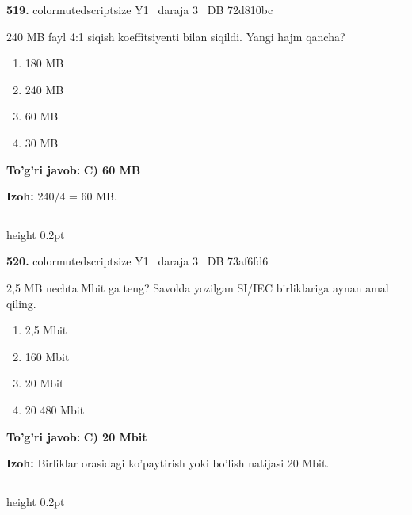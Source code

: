 \documentclass[10pt,a4paper,oneside]{article}
\begin{document}
\noindent\textbf{\color{ink}519.}  {color{muted}scriptsize Y1 \textbullet\ daraja 3 \textbullet\ DB 72d810bc}
\par
240 MB fayl 4:1 siqish koeffitsiyenti bilan siqildi. Yangi hajm qancha?
\begin{enumerate}[label=\Alph*),leftmargin=9mm]
\item 180 MB
\item 240 MB
\item 60 MB
\item 30 MB
\end{enumerate}
\begin{tcolorbox}[enhanced,breakable,colback=teal!4,colframe=teal!50!black,boxrule=0.5pt,arc=1.1mm,left=3mm,right=3mm,top=1.7mm,bottom=1.7mm,before skip=2mm,after skip=2mm]
\textbf{\color{teal}To'g'ri javob:} \textbf{C) 60 MB}
\par\smallskip
\textbf{Izoh:} 240/4 = 60 MB.
\end{tcolorbox}
\vspace{2mm}\hrule height 0.2pt \vspace{3mm}

\noindent\textbf{\color{ink}520.}  {color{muted}scriptsize Y1 \textbullet\ daraja 3 \textbullet\ DB 73af6fd6}
\par
2,5 MB nechta Mbit ga teng? Savolda yozilgan SI/IEC birliklariga aynan amal qiling.
\begin{enumerate}[label=\Alph*),leftmargin=9mm]
\item 2,5 Mbit
\item 160 Mbit
\item 20 Mbit
\item 20 480 Mbit
\end{enumerate}
\begin{tcolorbox}[enhanced,breakable,colback=teal!4,colframe=teal!50!black,boxrule=0.5pt,arc=1.1mm,left=3mm,right=3mm,top=1.7mm,bottom=1.7mm,before skip=2mm,after skip=2mm]
\textbf{\color{teal}To'g'ri javob:} \textbf{C) 20 Mbit}
\par\smallskip
\textbf{Izoh:} Birliklar orasidagi ko'paytirish yoki bo'lish natijasi 20 Mbit.
\end{tcolorbox}
\vspace{2mm}\hrule height 0.2pt \vspace{3mm}
\end{document}
